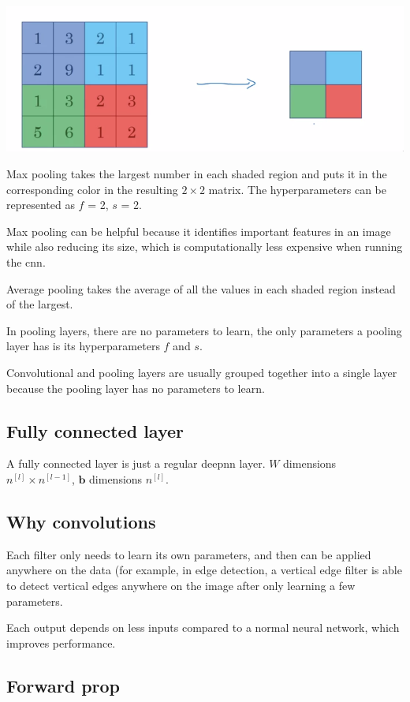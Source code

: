 \documentclass[12pt]{article}
\begin{document}
\includegraphics[scale=.5]{images/max-pooling.png}

Max pooling takes the largest number in each shaded region and puts it in the corresponding
color in the resulting $2 \times 2$ matrix. The hyperparameters can be represented as $f$ = 2,
$s$ = 2.

Max pooling can be helpful because it identifies important features in an image while also
reducing its size, which is computationally less expensive when running the cnn.

Average pooling takes the average of all the values in each shaded region instead of the
largest.

In pooling layers, there are no parameters to learn, the only parameters a pooling layer
has is its hyperparameters $f$ and $s$.

Convolutional and pooling layers are usually grouped together into a single layer because
the pooling layer has no parameters to learn.

\subsection{Fully connected layer}

A fully connected layer is just a regular deepnn layer. $W$ dimensions $n^{[l]} \times n^{[l-1]}$,
$\bm b$ dimensions $n^{[l]}$.

\subsection{Why convolutions}

Each filter only needs to learn its own parameters, and then can be applied anywhere on the
data (for example, in edge detection, a vertical edge filter is able to detect vertical edges
anywhere on the image after only learning a few parameters.

Each output depends on less inputs compared to a normal neural network, which improves
performance.

\subsection{Forward prop}
\end{document}
